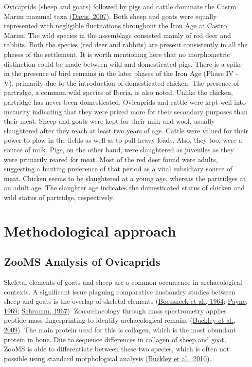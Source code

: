\documentclass[3p]{elsarticle} %
\begin{document}
Ovicaprids (sheep and goats) followed by pigs and cattle dominate the Castro Marim mammal taxa (\protect\hyperlink{ref-davis07}{Davis, 2007}). Both sheep and goats were equally represented with negligible fluctuations throughout the Iron Age at Castro Marim. The wild species in the assemblage consisted mainly of red deer and rabbits. Both the species (red deer and rabbits) are present consistently in all the phases of the settlement. It is worth mentioning here that no morphometric distinction could be made between wild and domesticated pigs. There is a spike in the presence of bird remains in the later phases of the Iron Age (Phase IV - V), primarily due to the introduction of domesticated chicken. The presence of partridge, a common wild species of Iberia, is also noted. Unlike the chicken, partridge has never been domesticated. Ovicaprids and cattle were kept well into maturity indicating that they were prized more for their secondary purposes than their meat. Sheep and goats were kept for their milk and wool, usually slaughtered after they reach at least two years of age. Cattle were valued for their power to plow in the fields as well as to pull heavy loads. Also, they too, were a source of milk. Pigs, on the other hand, were slaughtered as juveniles as they were primarily reared for meat. Most of the red deer found were adults, suggesting a hunting preference of that period as a vital subsidiary source of meat. Chicken seems to be slaughtered at a young age, whereas the partridges at an adult age. The slaughter age indicates the domesticated status of chicken and wild status of partridge, respectively.

\hypertarget{methodological-approach}{%
\section{Methodological approach}\label{methodological-approach}}

\hypertarget{zooms-analysis-of-ovicaprids}{%
\subsection{ZooMS Analysis of Ovicaprids}\label{zooms-analysis-of-ovicaprids}}

Skeletal elements of goats and sheep are a common occurrence in archaeological contexts. A significant issue plaguing comparative husbandry studies between sheep and goats is the overlap of skeletal elements (\protect\hyperlink{ref-boessneck_etal64}{Boessneck et al., 1964}; \protect\hyperlink{ref-payne69}{Payne, 1969}; \protect\hyperlink{ref-schramm67}{Schramm, 1967}). Zooarchaeology through mass spectrometry applies peptide mass fingerprinting to identify archaeological remains (\protect\hyperlink{ref-buckley_etal09}{Buckley et al., 2009}). The main protein used for this is collagen, which is the most abundant protein in bone. Due to sequence differences in collagen of sheep and goat, ZooMS is able to differentiate between these two species, which is often not possible using standard morphological analysis (\protect\hyperlink{ref-buckley_etal10}{Buckley et al., 2010}).
\end{document}
